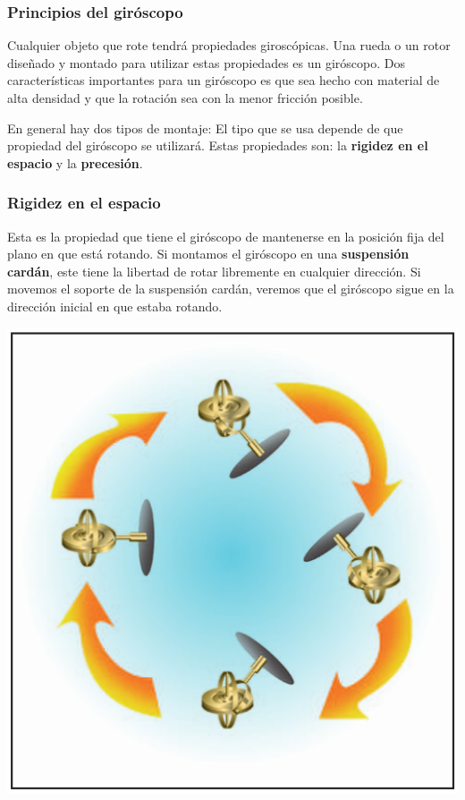 \documentclass{article}
\begin{document}
\subsubsection{Principios del giróscopo}
Cualquier objeto que rote tendrá propiedades giroscópicas. Una rueda o un rotor diseñado y montado para utilizar estas propiedades es un giróscopo. Dos características importantes para un giróscopo es que sea hecho con material de alta densidad y que la rotación sea con la menor fricción posible.

En general hay dos tipos de montaje: El tipo que se usa depende de que propiedad del giróscopo se utilizará. Estas propiedades son: la \textbf{rigidez en el espacio} y la \textbf{precesión}. 
\subsubsection{Rigidez en el espacio}
Esta es la propiedad que tiene el giróscopo de mantenerse en la posición fija del plano en que está rotando. Si montamos el giróscopo en una \textbf{suspensión cardán}, este tiene la libertad de rotar libremente en cualquier dirección. Si movemos el soporte de la suspensión cardán, veremos que el giróscopo sigue en la dirección inicial en que estaba rotando.

\begin{center}
\includegraphics[scale=0.5]{figuras/giroscopo-rigidez.png}
\label{fig:rigidez}
\end{center}
\end{document}
